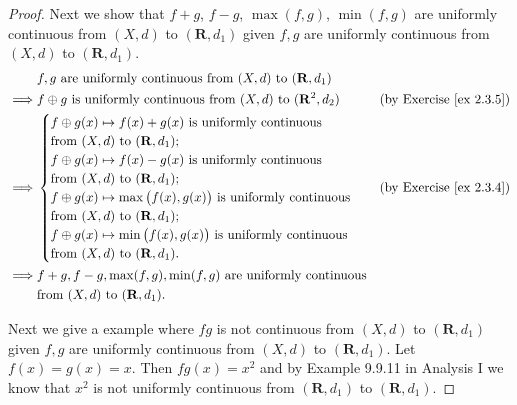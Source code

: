 \begin{proof}
    Next we show that \(f + g\), \(f - g\), \(\max(f, g)\), \(\min(f, g)\) are uniformly continuous from \((X, d)\) to \((\mathbf{R}, d_1)\) given \(f, g\) are uniformly continuous from \((X, d)\) to \((\mathbf{R}, d_1)\).
    \begin{align*}
                 & f, g \text{ are uniformly continuous from } (X, d) \text{ to } (\mathbf{R}, d_1)                                              \\
        \implies & f \oplus g \text{ is uniformly continuous from } (X, d) \text{ to } (\mathbf{R}^2, d_2) & \text{(by Exercise \ref{ex 2.3.5})} \\
        \implies & \begin{cases}
                       f \oplus g(x) \mapsto f(x) + g(x) \text{ is uniformly continuous}              \\
                       \text{from } (X, d) \text{ to } (\mathbf{R}, d_1);                             \\
                       f \oplus g(x) \mapsto f(x) - g(x) \text{ is uniformly continuous}              \\
                       \text{from } (X, d) \text{ to } (\mathbf{R}, d_1);                             \\
                       f \oplus g(x) \mapsto \max\big(f(x), g(x)\big) \text{ is uniformly continuous} \\
                       \text{from } (X, d) \text{ to } (\mathbf{R}, d_1);                             \\
                       f \oplus g(x) \mapsto \min\big(f(x), g(x)\big) \text{ is uniformly continuous} \\
                       \text{from } (X, d) \text{ to } (\mathbf{R}, d_1).
                   \end{cases}       & \text{(by Exercise \ref{ex 2.3.4})}                                                \\
        \implies & f + g, f - g, \max(f, g), \min(f, g) \text{ are uniformly continuous}                                                         \\
                 & \text{from } (X, d) \text{ to } (\mathbf{R}, d_1).
    \end{align*}

    Next we give a example where \(fg\) is not continuous from \((X, d)\) to \((\mathbf{R}, d_1)\) given \(f, g\) are uniformly continuous from \((X, d)\) to \((\mathbf{R}, d_1)\).
    Let \(f(x) = g(x) = x\).
    Then \(fg(x) = x^2\) and by Example 9.9.11 in Analysis I we know that \(x^2\) is not uniformly continuous from \((\mathbf{R}, d_1)\) to \((\mathbf{R}, d_1)\).


\end{proof}
